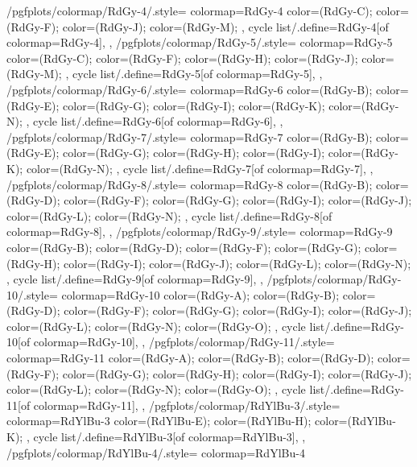 {  /pgfplots/colormap/RdGy-4/.style={
    colormap={RdGy-4}{
      color=(RdGy-C);
      color=(RdGy-F);
      color=(RdGy-J);
      color=(RdGy-M);
    },
    cycle list/.define={RdGy-4}{[of colormap=RdGy-4]},
  },
  /pgfplots/colormap/RdGy-5/.style={
    colormap={RdGy-5}{
      color=(RdGy-C);
      color=(RdGy-F);
      color=(RdGy-H);
      color=(RdGy-J);
      color=(RdGy-M);
    },
    cycle list/.define={RdGy-5}{[of colormap=RdGy-5]},
  },
  /pgfplots/colormap/RdGy-6/.style={
    colormap={RdGy-6}{
      color=(RdGy-B);
      color=(RdGy-E);
      color=(RdGy-G);
      color=(RdGy-I);
      color=(RdGy-K);
      color=(RdGy-N);
    },
    cycle list/.define={RdGy-6}{[of colormap=RdGy-6]},
  },
  /pgfplots/colormap/RdGy-7/.style={
    colormap={RdGy-7}{
      color=(RdGy-B);
      color=(RdGy-E);
      color=(RdGy-G);
      color=(RdGy-H);
      color=(RdGy-I);
      color=(RdGy-K);
      color=(RdGy-N);
    },
    cycle list/.define={RdGy-7}{[of colormap=RdGy-7]},
  },
  /pgfplots/colormap/RdGy-8/.style={
    colormap={RdGy-8}{
      color=(RdGy-B);
      color=(RdGy-D);
      color=(RdGy-F);
      color=(RdGy-G);
      color=(RdGy-I);
      color=(RdGy-J);
      color=(RdGy-L);
      color=(RdGy-N);
    },
    cycle list/.define={RdGy-8}{[of colormap=RdGy-8]},
  },
  /pgfplots/colormap/RdGy-9/.style={
    colormap={RdGy-9}{
      color=(RdGy-B);
      color=(RdGy-D);
      color=(RdGy-F);
      color=(RdGy-G);
      color=(RdGy-H);
      color=(RdGy-I);
      color=(RdGy-J);
      color=(RdGy-L);
      color=(RdGy-N);
    },
    cycle list/.define={RdGy-9}{[of colormap=RdGy-9]},
  },
  /pgfplots/colormap/RdGy-10/.style={
    colormap={RdGy-10}{
      color=(RdGy-A);
      color=(RdGy-B);
      color=(RdGy-D);
      color=(RdGy-F);
      color=(RdGy-G);
      color=(RdGy-I);
      color=(RdGy-J);
      color=(RdGy-L);
      color=(RdGy-N);
      color=(RdGy-O);
    },
    cycle list/.define={RdGy-10}{[of colormap=RdGy-10]},
  },
  /pgfplots/colormap/RdGy-11/.style={
    colormap={RdGy-11}{
      color=(RdGy-A);
      color=(RdGy-B);
      color=(RdGy-D);
      color=(RdGy-F);
      color=(RdGy-G);
      color=(RdGy-H);
      color=(RdGy-I);
      color=(RdGy-J);
      color=(RdGy-L);
      color=(RdGy-N);
      color=(RdGy-O);
    },
    cycle list/.define={RdGy-11}{[of colormap=RdGy-11]},
  },
  /pgfplots/colormap/RdYlBu-3/.style={
    colormap={RdYlBu-3}{
      color=(RdYlBu-E);
      color=(RdYlBu-H);
      color=(RdYlBu-K);
    },
    cycle list/.define={RdYlBu-3}{[of colormap=RdYlBu-3]},
  },
  /pgfplots/colormap/RdYlBu-4/.style={
    colormap={RdYlBu-4}{
}}}
